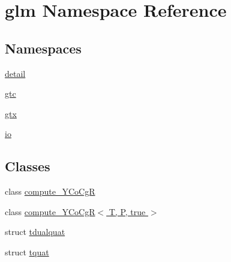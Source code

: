 \hypertarget{namespaceglm}{}\section{glm Namespace Reference}
\label{namespaceglm}
\subsection*{Namespaces}
\begin{DoxyCompactItemize}
\item 
 \hyperlink{namespaceglm_1_1detail}{detail}
\item 
 \hyperlink{namespaceglm_1_1gtc}{gtc}
\item 
 \hyperlink{namespaceglm_1_1gtx}{gtx}
\item 
 \hyperlink{namespaceglm_1_1io}{io}
\end{DoxyCompactItemize}
\subsection*{Classes}
\begin{DoxyCompactItemize}
\item 
class \hyperlink{classglm_1_1compute___y_co_cg_r}{compute\+\_\+\+Y\+Co\+Cg\+R}
\item 
class \hyperlink{classglm_1_1compute___y_co_cg_r_3_01_t_00_01_p_00_01true_01_4}{compute\+\_\+\+Y\+Co\+Cg\+R$<$ T, P, true $>$}
\item 
struct \hyperlink{structglm_1_1tdualquat}{tdualquat}
\item 
struct \hyperlink{structglm_1_1tquat}{tquat}
\end{DoxyCompactItemize}
